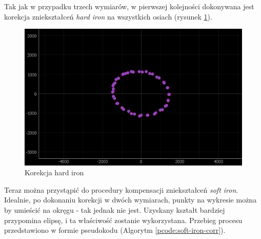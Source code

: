 Tak jak w przypadku trzech wymiarów, w pierwszej kolejności dokonywana jest korekcja zniekształceń \emph{hard iron} na wszystkich osiach (rysunek \ref{fig:2d-mag-hard-corr-xy}).

\begin{figure}[H]
	\centering
		\includegraphics[width=0.6\linewidth]{rys/ScanBot-10-2d-calibration-theta-sigma-2-added-hard-offset-reset-data-so-soft-iron-values-are-proper.PNG}
	\caption{Korekcja hard iron}
	\label{fig:2d-mag-hard-corr-xy}
\end{figure}


Teraz można przystąpić do procedury kompensacji zniekształceń \emph{soft iron}. Idealnie, po dokonaniu korekcji w dwóch wymiarach, punkty na wykresie można by umieścić na okręgu - tak jednak nie jest. Uzyskany kształt bardziej przypomina elipsę, i ta właściwość zostanie wykorzystana. Przebieg procesu przedstawiono w formie pseudokodu (Algorytm \ref{pcode:soft-iron-corr}).

